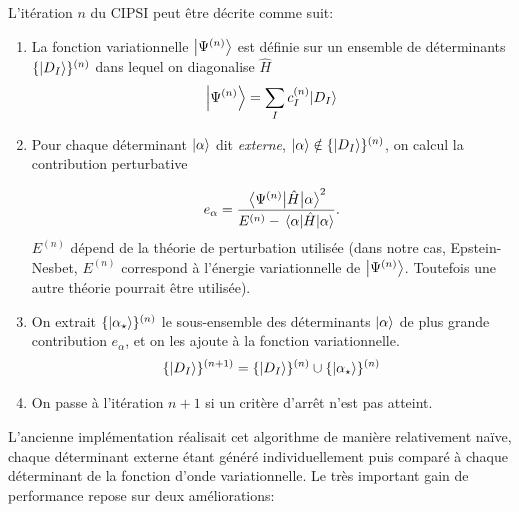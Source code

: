 \documentclass[./thesis.tex]{subfiles}
\begin{document}
L'itération $n$ du CIPSI peut être décrite comme suit:
\begin{enumerate}
\item
La fonction variationnelle $\ket {\Psi^{(n)}}$ est définie sur un ensemble de déterminants $\{\ket{D_I}\}^{(n)}$ dans lequel on diagonalise $\widehat{H}$
\begin{equation}
\ket{\Psi^{(n)}} = \sum_{I} c_I^{(n)} {\ket{D_I}}
\end{equation}
\item

Pour chaque déterminant ${\ket{\alpha}}$ dit \emph{externe}, ${\ket{\alpha}} \notin \{\ket{D_I}\}^{(n)}$, on calcul la contribution perturbative

\begin{equation}
e_\alpha = \frac{\mel{\Psi^{(n)}}{\hat{H}}{\alpha}^2}{E^{(n)} - \mel{\alpha}{\hat{H}}{\alpha}}.
\end{equation}
$E^{(n)}$ dépend de la théorie de perturbation utilisée (dans notre cas, Epstein-Nesbet, $E^{(n)}$ correspond à l'énergie variationnelle de $\ket{\Psi^{(n)}}$. Toutefois une autre théorie pourrait être utilisée).
\item
On extrait $\{ \ket{\alpha_\star} \}^{(n)}$ le sous-ensemble des déterminants ${\ket{\alpha}}$ de plus grande contribution $e_\alpha$, et on les ajoute à la fonction variationnelle.
\begin{equation}
\{\ket{D_I}\}^{(n+1)} = \{\ket{D_I}\}^{(n)} \cup \{ \ket {\alpha_\star} \}^{(n)}
\end{equation}
\item
On passe à l'itération $n+1$ si un critère d’arrêt n'est pas atteint.
\end{enumerate}
L'ancienne implémentation réalisait cet algorithme de manière relativement naïve, chaque déterminant externe étant généré individuellement puis comparé à chaque déterminant de la fonction d'onde variationnelle.
Le très important gain de performance repose sur deux améliorations:
\end{document}
